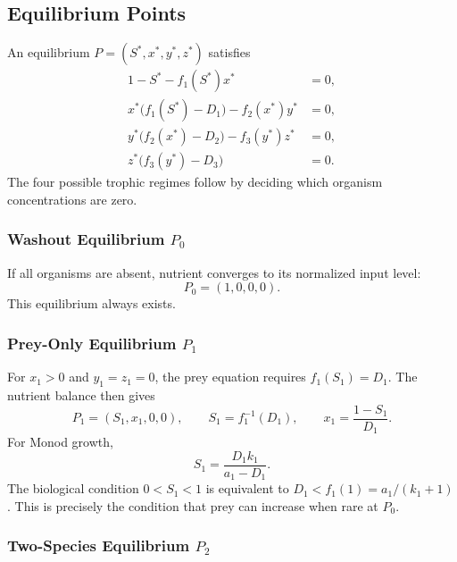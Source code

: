 \subsection{Equilibrium Points}

An equilibrium \(P=(S^*,x^*,y^*,z^*)\) satisfies
\begin{equation}
\label{eq:equilibrium-system}
\begin{aligned}
1-S^*-f_1(S^*)x^*&=0,\\
x^*\bigl(f_1(S^*)-D_1\bigr)-f_2(x^*)y^*&=0,\\
y^*\bigl(f_2(x^*)-D_2\bigr)-f_3(y^*)z^*&=0,\\
z^*\bigl(f_3(y^*)-D_3\bigr)&=0.
\end{aligned}
\end{equation}
The four possible trophic regimes follow by deciding which organism
concentrations are zero.

\subsubsection{Washout Equilibrium \(P_0\)}

If all organisms are absent, nutrient converges to its normalized input level:
\begin{equation}
P_0=(1,0,0,0).
\end{equation}
This equilibrium always exists.

\subsubsection{Prey-Only Equilibrium \(P_1\)}

For \(x_1>0\) and \(y_1=z_1=0\), the prey equation requires
\(f_1(S_1)=D_1\).  The nutrient balance then gives
\begin{equation}
\label{eq:p1}
P_1=(S_1,x_1,0,0),\qquad
S_1=f_1^{-1}(D_1),\qquad
x_1=\frac{1-S_1}{D_1}.
\end{equation}
For Monod growth,
\begin{equation}
S_1=\frac{D_1k_1}{a_1-D_1}.
\end{equation}
The biological condition \(0<S_1<1\) is equivalent to
\(D_1<f_1(1)=a_1/(k_1+1)\).  This is precisely the condition that prey can
increase when rare at \(P_0\).

\subsubsection{Two-Species Equilibrium \(P_2\)}

